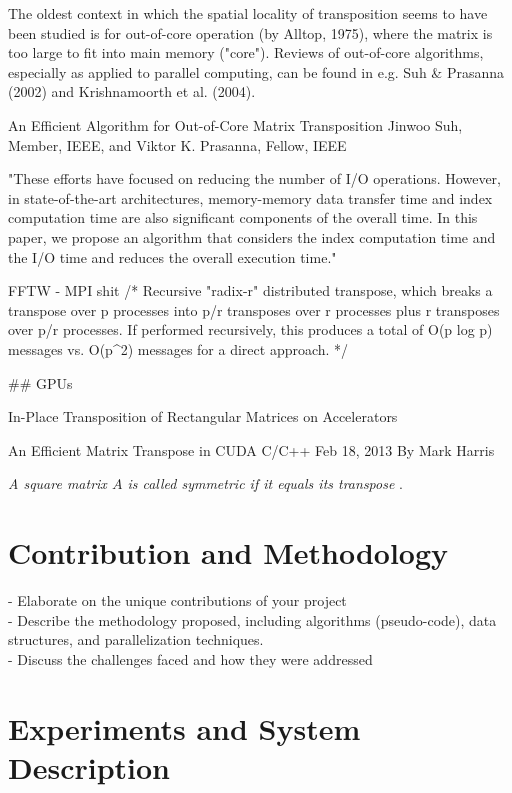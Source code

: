 \documentclass[conference]{IEEEtran}
\begin{document}
 The oldest context in which the spatial locality of transposition seems to have been studied is for out-of-core operation (by Alltop, 1975), where the matrix is too large to fit into main memory ("core"). 
 Reviews of out-of-core algorithms, especially as applied to parallel computing, can be found in e.g. Suh & Prasanna (2002) and Krishnamoorth et al. (2004). 
 
 An Efficient Algorithm for
 Out-of-Core Matrix Transposition
 Jinwoo Suh, Member, IEEE, and Viktor K. Prasanna, Fellow, IEEE
 
 	"These efforts have focused on reducing the number
 	of I/O operations. However, in state-of-the-art architectures, memory-memory data transfer time and index computation time are also
 	significant components of the overall time. In this paper, we propose an algorithm that considers the index computation time and the
 	I/O time and reduces the overall execution time."
 	
FFTW - MPI shit
/* Recursive "radix-r" distributed transpose, which breaks a transpose
over p processes into p/r transposes over r processes plus r
transposes over p/r processes.  If performed recursively, this
produces a total of O(p log p) messages vs. O(p^2) messages for a
direct approach.
*/

## GPUs

In-Place Transposition of Rectangular Matrices on Accelerators

An Efficient Matrix Transpose in CUDA C/C++
Feb 18, 2013
By Mark Harris 



\textit{A square matrix $A$ is called symmetric if it equals its transpose} \cite{b100}.


\section{Contribution and Methodology}

- Elaborate on the unique contributions of your project \\
- Describe the methodology proposed, including algorithms (pseudo-code),
data structures, and parallelization techniques. \\
- Discuss the challenges faced and how they were addressed \\

\blindtext\blindtext

\section{Experiments and System Description}
\end{document}
